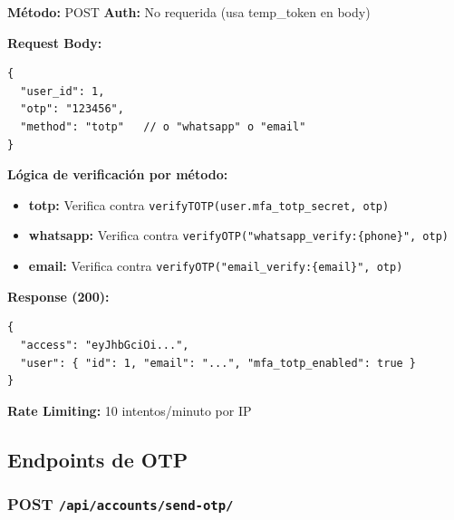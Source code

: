 \documentclass[12pt,a4paper,openany]{article}
\begin{document}
\begin{infobox}
\textbf{Método:} POST \quad \textbf{Auth:} No requerida (usa temp\_token en body)

\textbf{Request Body:}
\begin{lstlisting}[style=jsstyle]
{
  "user_id": 1,
  "otp": "123456",
  "method": "totp"   // o "whatsapp" o "email"
}
\end{lstlisting}

\textbf{Lógica de verificación por método:}
\begin{itemize}
    \item \textbf{totp:} Verifica contra \texttt{verifyTOTP(user.mfa\_totp\_secret, otp)}
    \item \textbf{whatsapp:} Verifica contra \texttt{verifyOTP("whatsapp\_verify:\{phone\}", otp)}
    \item \textbf{email:} Verifica contra \texttt{verifyOTP("email\_verify:\{email\}", otp)}
\end{itemize}

\textbf{Response (200):}
\begin{lstlisting}[style=jsstyle]
{
  "access": "eyJhbGciOi...",
  "user": { "id": 1, "email": "...", "mfa_totp_enabled": true }
}
\end{lstlisting}

\textbf{Rate Limiting:} 10 intentos/minuto por IP
\end{infobox}

\subsection{Endpoints de OTP}

\subsubsection{POST \texttt{/api/accounts/send-otp/}}
\end{document}
